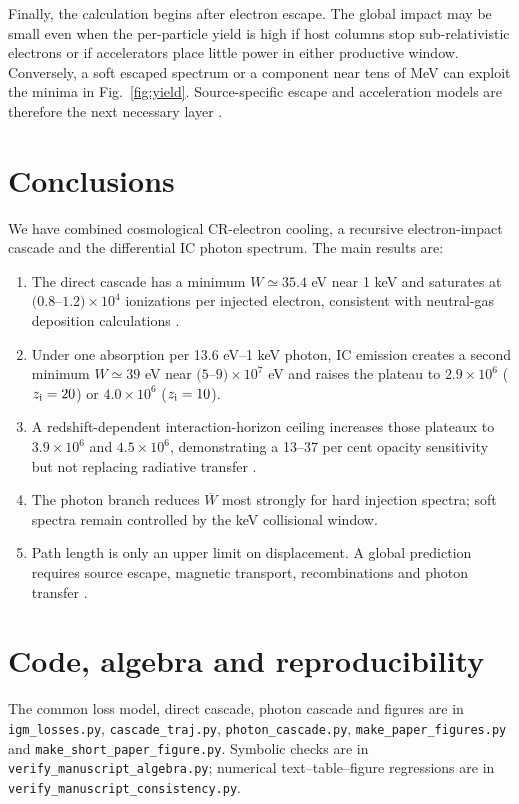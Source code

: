 \documentclass[10pt,twocolumn]{article}
\newcommand{\zi}{z_{\rm i}}
\begin{document}
Finally, the calculation begins after electron escape. The global impact may
be small even when the per-particle yield is high if host columns stop
sub-relativistic electrons or if accelerators place little power in either
productive window. Conversely, a soft escaped spectrum or a component near
tens of MeV can exploit the minima in Fig.~\ref{fig:yield}. Source-specific
escape and acceleration models are therefore the next necessary layer
\citep{Park2015,Ruszkowski2023}.

\section{Conclusions}

We have combined cosmological CR-electron cooling, a recursive
electron-impact cascade and the differential IC photon spectrum. The main
results are:
\begin{enumerate}
\item The direct cascade has a minimum $W\simeq35.4$ eV near 1 keV and
saturates at $(0.8$--$1.2)\times10^4$ ionizations per injected electron,
consistent with neutral-gas deposition calculations
\citep{Shull1985,Furlanetto2010}.
\item Under one absorption per 13.6 eV--1 keV photon, IC emission creates a
second minimum $W\simeq39$ eV near $(5$--$9)\times10^7$ eV and raises the
plateau to $2.9\times10^6$ ($\zi=20$) or $4.0\times10^6$ ($\zi=10$).
\item A redshift-dependent interaction-horizon ceiling increases those
plateaux to $3.9\times10^6$ and $4.5\times10^6$, demonstrating a 13--37 per
cent opacity sensitivity but not replacing radiative transfer
\citep{Karzas1961,Slatyer2016}.
\item The photon branch reduces $\overline W$ most strongly for hard injection
spectra; soft spectra remain controlled by the keV collisional window.
\item Path length is only an upper limit on displacement. A global prediction
requires source escape, magnetic transport, recombinations and photon transfer
\citep{Jana2018,Ruszkowski2023}.
\end{enumerate}

\section*{Code, algebra and reproducibility}
The common loss model, direct cascade, photon cascade and figures are in
\texttt{igm\_losses.py}, \texttt{cascade\_traj.py},
\texttt{photon\_cascade.py}, \texttt{make\_paper\_figures.py} and
\texttt{make\_short\_paper\_figure.py}. Symbolic checks are in
\texttt{verify\_manuscript\_algebra.py}; numerical text--table--figure
regressions are in \texttt{verify\_manuscript\_consistency.py}.

\footnotesize
\balance

\end{document}
